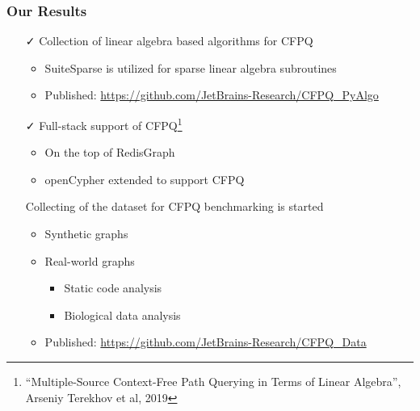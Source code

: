 \documentclass[xcolor=table,aspectratio=169]{beamer}
\begin{document}
\begin{frame}[fragile]
  \frametitle{Our Results}

  \begin{itemize}
    \item[\faCheck] Collection of linear algebra based algorithms for CFPQ
    \begin{itemize}
      \item SuiteSparse is utilized for sparse linear algebra subroutines
      \item Published: \url{https://github.com/JetBrains-Research/CFPQ_PyAlgo}
    \end{itemize}
    \pause
    \item[\faCheck] Full-stack support of CFPQ\footnote{``Multiple-Source Context-Free Path Querying in Terms of Linear Algebra'', Arseniy Terekhov et al, 2019}    
    \begin{itemize}
      \item On the top of RedisGraph
      \item openCypher extended to support CFPQ
    \end{itemize} 
    \pause 
    \item[\faGears] Collecting of the dataset for CFPQ benchmarking is started
    \begin{itemize}
      \item Synthetic graphs
      \item Real-world graphs
      \begin{itemize}
        \item Static code analysis
        \item Biological data analysis
      \end{itemize}
      \item Published: \url{https://github.com/JetBrains-Research/CFPQ_Data} 
    \end{itemize}     
  \end{itemize}

\end{frame}
\end{document}
